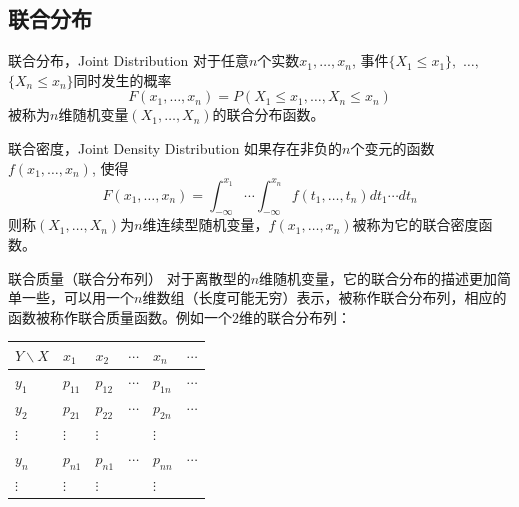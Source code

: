 
\subsection{联合分布}


\begin{frame}

\begin{block}{联合分布，Joint Distribution}
对于任意$n$个实数$x_1, \ldots, x_n$, 事件$\{X_1 \le x_1\},$ $\ldots,$ $\{X_n \le x_n\}$同时发生的概率
\[F(x_1,\ldots,x_n) = P(X_1 \le x_1, \ldots, X_n \le x_n)\]
被称为$n$维随机变量$(X_1, \ldots, X_n)$的联合分布函数。
\end{block}

\begin{block}{联合密度，Joint Density Distribution}
如果存在非负的$n$个变元的函数$f(x_1,\ldots,x_n)$, 使得
\[F(x_1,\ldots,x_n) = \int_{-\infty}^{x_1} \cdots \int_{-\infty}^{x_n} f(t_1,\ldots,t_n) dt_1 \cdots dt_n\]
则称$(X_1, \ldots, X_n)$为$n$维连续型随机变量，$f(x_1,\ldots,x_n)$被称为它的联合密度函数。
\end{block}

\end{frame}


\begin{frame}

\begin{block}{联合质量（联合分布列）}
对于离散型的$n$维随机变量，它的联合分布的描述更加简单一些，可以用一个$n$维数组（长度可能无穷）表示，被称作联合分布列，相应的函数被称作联合质量函数。例如一个$2$维的联合分布列：
\begin{center}
\renewcommand{\arraystretch}{1.5}
\begin{tabu} to 0.8\textwidth { X[c] | X[c] | X[c] | X[c] | X[c] | X[c] }
\hline
$Y \backslash X$ & $x_1$ & $x_2$ & $\cdots$ & $x_n$ & $\cdots$ \\
\hline
$y_1$ & $p_{11}$ & $p_{12}$ & $\cdots$ & $p_{1n}$ & $\cdots$ \\
\hline
$y_2$ & $p_{21}$ & $p_{22}$ & $\cdots$ & $p_{2n}$ & $\cdots$ \\
\hline
$\vdots$ & $\vdots$ & $\vdots$ &  & $\vdots$ &  \\
\hline
$y_n$ & $p_{n1}$ & $p_{n1}$ & $\cdots$ & $p_{nn}$ & $\cdots$ \\
\hline
$\vdots$ & $\vdots$ & $\vdots$ &  & $\vdots$ &  \\
\end{tabu}
\renewcommand{\arraystretch}{1}
\end{center}
\end{block}

\end{frame}


